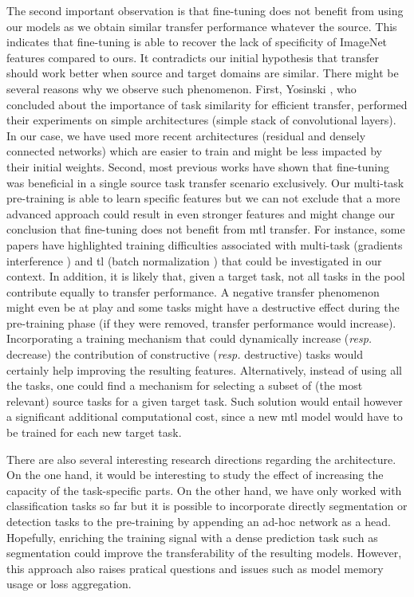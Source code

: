 The second important observation is that fine-tuning does not benefit from using our models as we obtain similar transfer performance whatever the source. This indicates that fine-tuning is able to recover the lack of specificity of ImageNet features compared to ours. It contradicts our initial hypothesis that transfer should work better when source and target domains are similar. There might be several reasons why we observe such phenomenon. First, Yosinski \etal \parencite{yosinski2014transferable}, who concluded about the importance of task similarity for efficient transfer, performed their experiments on simple architectures (\eg simple stack of convolutional layers). In our case, we have used more recent architectures (\ie residual and densely connected networks) which are easier to train and might be less impacted by their initial weights. Second, most previous works have shown that fine-tuning was beneficial in a single source task transfer scenario exclusively. Our multi-task pre-training is able to learn specific features but we can not exclude that a more advanced approach could result in even stronger features and might change our conclusion that fine-tuning does not benefit from \acrshort{mtl} transfer. For instance, some papers have highlighted training difficulties associated with multi-task (\eg gradients interference \parencite{yu2020gradient}) and \acrlong{tl} (\eg batch normalization \parencite{chang2019domain}) that could be investigated in our context. In addition, it is likely that, given a target task, not all tasks in the pool contribute equally to transfer performance. A negative transfer phenomenon might even be at play and some tasks might have a destructive effect during the pre-training phase (\ie if they were removed, transfer performance would increase). Incorporating a training mechanism that could dynamically increase (\textit{resp.} decrease) the contribution of constructive (\textit{resp.} destructive) tasks would certainly help improving the resulting features. Alternatively, instead of using all the tasks, one could find a mechanism for selecting a subset of (the most relevant) source tasks for a given target task. Such solution would entail however a significant additional computational cost, since a new \acrshort{mtl} model would have to be trained for each new target task.

There are also several interesting research directions regarding the architecture. On the one hand, it would be interesting to study the effect of increasing the capacity of the task-specific parts. On the other hand, we have only worked with classification tasks so far but it is possible to incorporate directly segmentation or detection tasks to the pre-training by appending an ad-hoc network as a head. Hopefully, enriching the training signal with a dense prediction task such as segmentation could improve the transferability of the resulting models. However, this approach also raises pratical questions and issues such as model memory usage or loss aggregation. 

